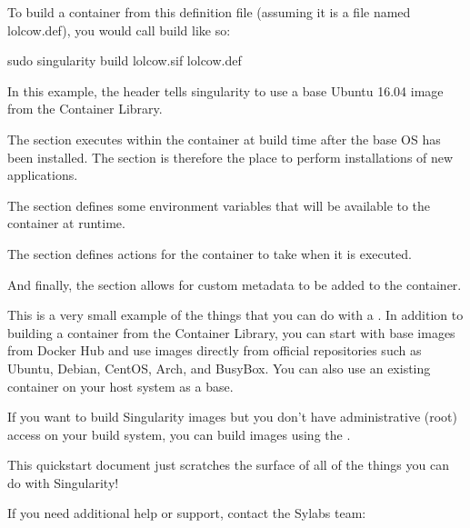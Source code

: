 \documentclass[letterpaper,10pt,english]{sphinxmanual}
\begin{document}
To build a container from this definition file (assuming it is a file
named lolcow.def), you would call build like so:

%
\begin{sphinxVerbatim}[commandchars=\\\{\}]
\PYGZdl{} sudo singularity build lolcow.sif lolcow.def
\end{sphinxVerbatim}

In this example, the header tells singularity to use a base Ubuntu 16.04 image
from the Container Library.

The  section executes within the container at build time after the base
OS has been installed. The  section is therefore the place to perform
installations of new applications.

The  section defines some environment variables that will be
available to the container at runtime.

The  section defines actions for the container to take when it is
executed.

And finally, the  section allows for custom metadata to be added to
the container.

This is a very small example of the things that you can do with a .
In addition to building a container from the Container Library, you can start
with base images from Docker Hub and use images directly from official
repositories such as Ubuntu, Debian, CentOS, Arch, and BusyBox.  You can also
use an existing container on your host system as a base.

If you want to build Singularity images but you don’t have administrative (root)
access on your build system, you can build images using the .

This quickstart document just scratches the surface of all of the things you can
do with Singularity!

If you need additional help or support, contact the Sylabs team:



\renewcommand{\indexname}{Index}
\printindex
\end{document}
